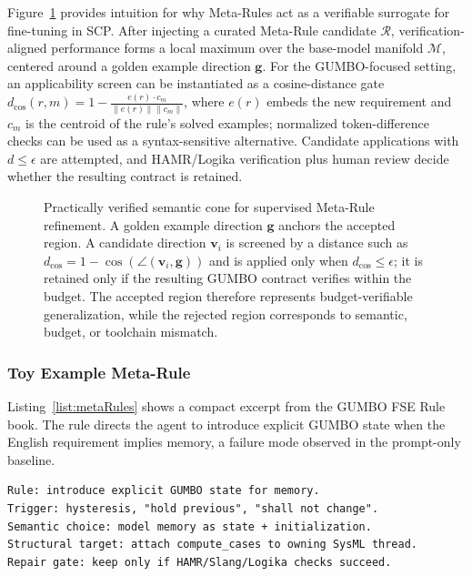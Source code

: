 \documentclass[conference]{IEEEtran}
\begin{document}
Figure~\ref{fig:vsc} provides intuition for why Meta-Rules act as a verifiable surrogate for fine-tuning in SCP. After injecting a curated Meta-Rule candidate $\mathcal{R}$, verification-aligned performance forms a local maximum over the base-model manifold $\mathcal{M}$, centered around a golden example direction $\mathbf{g}$. For the GUMBO-focused setting, an applicability screen can be instantiated as a cosine-distance gate $d_{\cos}(r,m)=1-\frac{e(r)\cdot c_m}{\|e(r)\|\|c_m\|}$, where $e(r)$ embeds the new requirement and $c_m$ is the centroid of the rule's solved examples; normalized token-difference checks can be used as a syntax-sensitive alternative. Candidate applications with $d\le\epsilon$ are attempted, and HAMR/Logika verification plus human review decide whether the resulting contract is retained.

\begin{figure}[t]
\centering
\resizebox{\columnwidth}{!}{}
\caption{Practically verified semantic cone for supervised Meta-Rule refinement. A golden example direction $\mathbf{g}$ anchors the accepted region. A candidate direction $\mathbf{v}_i$ is screened by a distance such as $d_{\cos}=1-\cos(\angle(\mathbf{v}_i,\mathbf{g}))$ and is applied only when $d_{\cos}\le\epsilon$; it is retained only if the resulting GUMBO contract verifies within the budget. The accepted region therefore represents budget-verifiable generalization, while the rejected region corresponds to semantic, budget, or toolchain mismatch.}
\label{fig:vsc}
\vspace{-0.6em}
\end{figure}

\subsubsection{Toy Example Meta-Rule}
Listing~\ref{list:metaRules} shows a compact excerpt from the GUMBO FSE Rule book. The rule directs the agent to introduce explicit GUMBO state when the English requirement implies memory, a failure mode observed in the prompt-only baseline.

\begin{lstlisting}[caption={Compact FSE rule excerpt linking linguistic, semantic, structural, and repair patterns.}, label={list:metaRules}]
Rule: introduce explicit GUMBO state for memory.
Trigger: hysteresis, "hold previous", "shall not change".
Semantic choice: model memory as state + initialization.
Structural target: attach compute_cases to owning SysML thread.
Repair gate: keep only if HAMR/Slang/Logika checks succeed.
\end{lstlisting}
\end{document}
